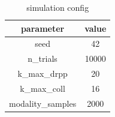 \begin{table}[h]
\centering
\begin{tabular}{|c|c|}
\hline
parameter & value \\ \hline
seed & 42 \\
n\_trials & 10000 \\
k\_max\_drpp & 20 \\
k\_max\_coll & 16 \\
modality\_samples & 2000 \\
\hline
\end{tabular}
\caption{simulation config}
\label{tab:T11}
\end{table}
